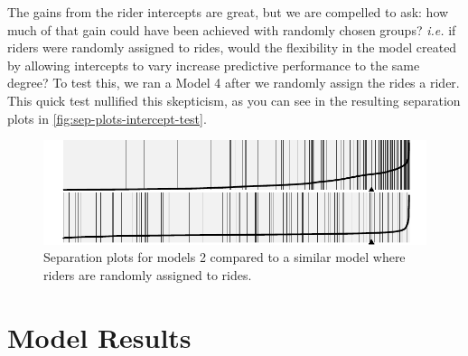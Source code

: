\documentclass[12pt,twoside]{reedthesis}
\begin{document}
  The gains from the rider intercepts are great, but we are compelled to
  ask: how much of that gain could have been achieved with randomly chosen
  groups? \textit{i.e.} if riders were randomly assigned to rides, would
  the flexibility in the model created by allowing intercepts to vary
  increase predictive performance to the same degree? To test this, we ran
  a Model 4 after we randomly assign the rides a rider. This quick test
  nullified this skepticism, as you can see in the resulting separation
  plots in \autoref{fig:sep-plots-intercept-test}.
  
  \begin{figure}[tbh]
  \centering
  \includegraphics[angle = 0,scale = 1]{figure/intercept_test_plot.pdf}
  \caption[Separation plots for models 2 compared to a similar model where
  riders are randomly assigned to rides.]{\normalsize{Separation plots for models 2 compared to a similar model where
  riders are randomly assigned to rides.}}
  \label{fig:sep-plots-intercept-test}
  \end{figure}
  
  \section{Model Results}\label{model-results}
  
\end{document}
